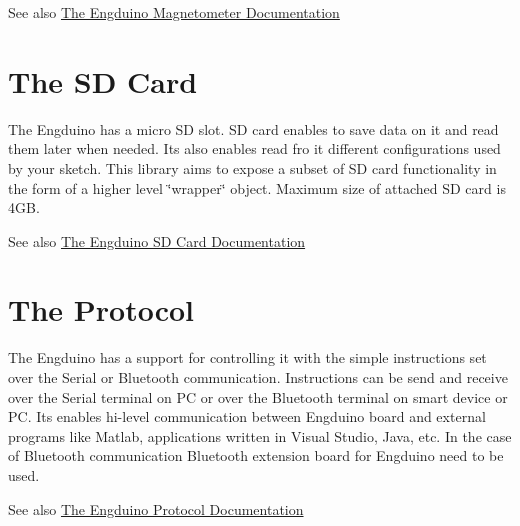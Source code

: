 \begin{DoxySeeAlso}{See also}
\hyperlink{class_engduino_magnetometer_class}{The Engduino Magnetometer Documentation }
\end{DoxySeeAlso}
\hypertarget{index_SD}{}\section{The S\+D Card}\label{index_SD}
The Engduino has a micro S\+D slot. S\+D card enables to save data on it and read them later when needed. It\textquotesingle{}s also enables read fro it different configurations used by your sketch. This library aims to expose a subset of S\+D card functionality in the form of a higher level \char`\"{}wrapper\char`\"{} object. Maximum size of attached S\+D card is 4\+G\+B.

\begin{DoxySeeAlso}{See also}
\hyperlink{class_engduino_s_d_class}{The Engduino S\+D Card Documentation }
\end{DoxySeeAlso}
\hypertarget{index_Protocol}{}\section{The Protocol}\label{index_Protocol}
The Engduino has a support for controlling it with the simple instructions set over the Serial or Bluetooth communication. Instructions can be send and receive over the Serial terminal on P\+C or over the Bluetooth terminal on smart device or P\+C. It\textquotesingle{}s enables hi-\/level communication between Engduino board and external programs like Matlab, applications written in Visual Studio, Java, etc. In the case of Bluetooth communication Bluetooth extension board for Engduino need to be used.

\begin{DoxySeeAlso}{See also}
\hyperlink{class_engduino_protocol_class}{The Engduino Protocol Documentation } 
\end{DoxySeeAlso}
